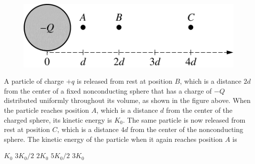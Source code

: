 \begin{figure}[H]
    \centering
    \includegraphics[scale=0.3]{images/img-015-041.png}
\end{figure}

\begin{questions}\setcounter{question}{33}\question
A particle of charge $+q$ is released from rest at position $B$, which is a distance $2 d$ from the center of a fixed nonconducting sphere that has a charge of $-Q$ distributed uniformly throughout its volume, as shown in the figure above. When the particle reaches position $A$, which is a distance $d$ from the center of the charged sphere, its kinetic energy is $K_{0}$. The same particle is now released from rest at position $C$, which is a distance $4 d$ from the center of the nonconducting sphere. The kinetic energy of the particle when it again reaches position $A$ is

\begin{oneparchoices}
\choice $K_{0}$
\choice $3 K_{0} / 2$
\choice $2 K_{0}$
\choice $5 K_{0} / 2$
\choice $3 K_{0}$
\end{oneparchoices}\end{questions}
